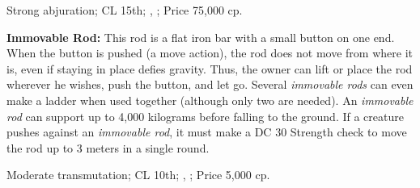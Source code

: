 Strong abjuration; CL 15th; , ; Price 75,000 cp.

\textbf{Immovable Rod:} This rod is a flat iron bar with a small button on one end. When the button is pushed (a move action), the rod does not move from where it is, even if staying in place defies gravity. Thus, the owner can lift or place the rod wherever he wishes, push the button, and let go. Several \emph{immovable rods} can even make a ladder when used together (although only two are needed). An \emph{immovable rod} can support up to 4,000 kilograms before falling to the ground. If a creature pushes against an \emph{immovable rod}, it must make a DC 30 Strength check to move the rod up to 3 meters in a single round.

Moderate transmutation; CL 10th; , ; Price 5,000 cp.






